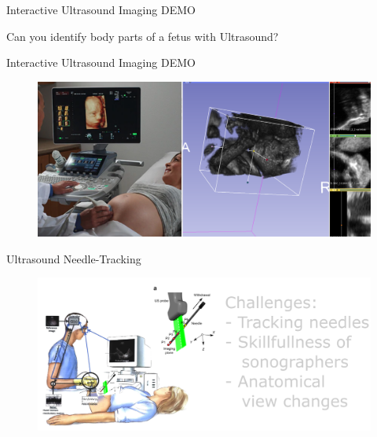 {
\begin{frame}{Interactive Ultrasound Imaging DEMO}

\BigSizeFont
Can you identify body parts of a fetus with Ultrasound?

\end{frame}
}

{


\begin{frame}{Interactive Ultrasound Imaging DEMO}
      \begin{figure}
        \centering
        \includegraphics[width=1.0\textwidth]{./figures/3dslicer/versions/drawing-v01.png}
      \end{figure}
\end{frame}
}




{
    \begin{frame}{Ultrasound Needle-Tracking}
      \begin{figure}
        \centering
        \includegraphics[width=1.0\textwidth]{./figures/sonographer-probe-patient/versions/drawing-v02.png}
      \end{figure}
\end{frame}
}







